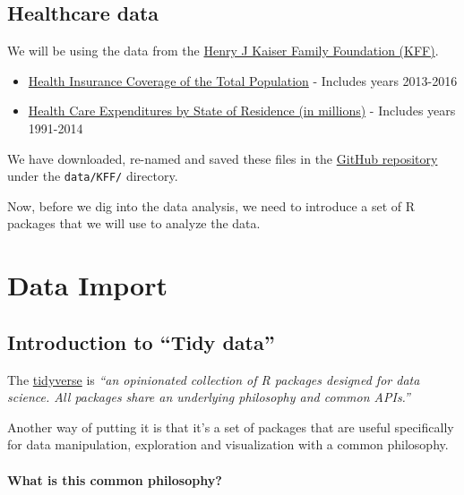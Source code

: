 \documentclass[]{article}
\providecommand{\tightlist}{%
  \setlength{\itemsep}{0pt}\setlength{\parskip}{0pt}}
\let\oldparagraph\paragraph
\renewcommand{\paragraph}[1]{\oldparagraph{#1}\mbox{}}
\begin{document}
\hypertarget{healthcare-data}{%
\subsection{Healthcare data}\label{healthcare-data}}

We will be using the data from the \href{https://www.kff.org}{Henry J
Kaiser Family Foundation (KFF)}.

\begin{itemize}
\tightlist
\item
  \href{https://www.kff.org/other/state-indicator/total-population/}{Health
  Insurance Coverage of the Total Population} - Includes years 2013-2016
\item
  \href{https://www.kff.org/other/state-indicator/health-care-expenditures-by-state-of-residence-in-millions/}{Health
  Care Expenditures by State of Residence (in millions)} - Includes
  years 1991-2014
\end{itemize}

We have downloaded, re-named and saved these files in the
\href{https://github.com/opencasestudies/ocs-healthexpenditure}{GitHub
repository} under the \texttt{data/KFF/} directory.

Now, before we dig into the data analysis, we need to introduce a set of
R packages that we will use to analyze the data.

\hypertarget{data-import}{%
\section{Data Import}\label{data-import}}

\hypertarget{introduction-to-tidy-data}{%
\subsection{Introduction to ``Tidy
data''}\label{introduction-to-tidy-data}}

The \href{https://www.tidyverse.org}{tidyverse} is \emph{``an
opinionated collection of R packages designed for data science. All
packages share an underlying philosophy and common APIs.''}

Another way of putting it is that it's a set of packages that are useful
specifically for data manipulation, exploration and visualization with a
common philosophy.

\hypertarget{what-is-this-common-philosophy}{%
\paragraph{What is this common
philosophy?}\label{what-is-this-common-philosophy}}
\end{document}
